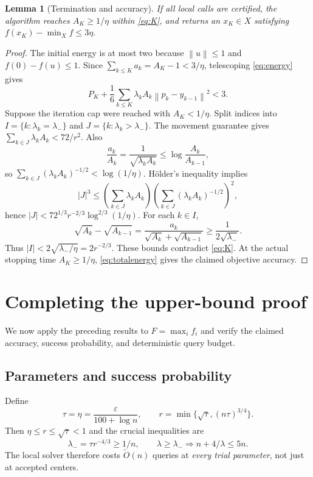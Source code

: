 \documentclass[11pt,a4paper]{article}
\newtheorem{lemma}[theorem]{Lemma}
\theoremstyle{definition}\newtheorem{definition}[theorem]{Definition}
\theoremstyle{remark}\newtheorem{remark}[theorem]{Remark}
\newcommand{\eps}{\varepsilon}
\newcommand{\norm}[1]{\left\|#1\right\|}
\newcommand{\tO}{\widetilde O}
\begin{document}
\begin{lemma}[Termination and accuracy]\label{lem:termination}
If all local calls are certified, the algorithm reaches $A_K\ge1/\eta$ within \eqref{eq:K}, and returns an $x_K\in X$ satisfying $f(x_K)-\min_X f\le3\eta$.
\end{lemma}
\begin{proof}
The initial energy is at most two because $\norm{u}\le1$ and $f(0)-f(u)\le1$. Since $\sum_{k\le K}a_k=A_K-1<3/\eta$, telescoping \eqref{eq:energy} gives
\begin{equation}\label{eq:totalenergy}
 P_K+\frac16\sum_{k\le K}\lambda_kA_k\norm{p_k-y_{k-1}}^2<3.
\end{equation}
Suppose the iteration cap were reached with $A_K<1/\eta$. Split indices into
$I=\{k:\lambda_k=\lambda_-\}$ and $J=\{k:\lambda_k>\lambda_-\}$.
The movement guarantee gives $\sum_{k\in J}\lambda_kA_k<72/r^2$. Also
\[
 \frac{a_k}{A_k}=\frac1{\sqrt{\lambda_kA_k}}
 \le\log\frac{A_k}{A_{k-1}},
\]
so $\sum_{k\in J}(\lambda_kA_k)^{-1/2}<\log(1/\eta)$. H\"older's inequality implies
\[
 |J|^3\le\left(\sum_{k\in J}\lambda_kA_k\right)
           \left(\sum_{k\in J}(\lambda_kA_k)^{-1/2}\right)^2,
\]
hence $|J|<72^{1/3}r^{-2/3}\log^{2/3}(1/\eta)$. For each $k\in I$,
\[
 \sqrt{A_k}-\sqrt{A_{k-1}}
 =\frac{a_k}{\sqrt{A_k}+\sqrt{A_{k-1}}}
 \ge\frac1{2\sqrt{\lambda_-}}.
\]
Thus $|I|<2\sqrt{\lambda_-/\eta}=2r^{-2/3}$. These bounds contradict \eqref{eq:K}. At the actual stopping time $A_K\ge1/\eta$, \eqref{eq:totalenergy} gives the claimed objective accuracy.
\end{proof}

\section{Completing the upper-bound proof}\label{sec:combine}
We now apply the preceding results to $F=\max_i f_i$ and verify the
claimed accuracy, success probability, and deterministic query budget.
\subsection{Parameters and success probability}
 Define
\begin{equation}\label{eq:parameters}
 \tau=\eta=\frac{\eps}{100+\log n},\qquad
 r=\min\{\sqrt\tau,(n\tau)^{3/4}\}.
\end{equation}
Then $\eta\le r\le\sqrt\tau<1$ and the crucial inequalities are
\begin{equation}\label{eq:crucial}
 \lambda_- =\tau r^{-4/3}\ge1/n,
 \qquad \lambda\ge\lambda_-\Longrightarrow
 n+4/\lambda\le5n.
\end{equation}
The local solver therefore costs $\tO(n)$ queries at \emph{every trial parameter}, not just at accepted centers.
\end{document}
